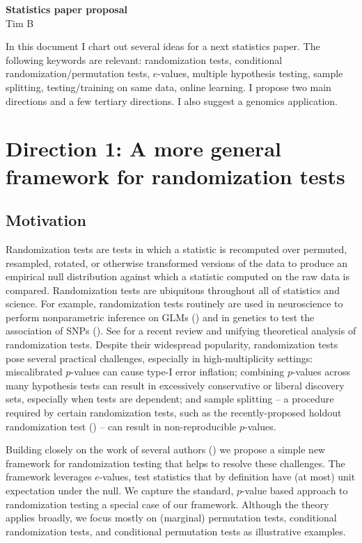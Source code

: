 \documentclass[12pt]{article}
\begin{document}
\begin{center}
\textbf{Statistics paper proposal} \\
Tim B
\end{center}

In this document I chart out several ideas for a next statistics paper. The following keywords are relevant: randomization tests, conditional randomization/permutation tests, $e$-values, multiple hypothesis testing, sample splitting, testing/training on same data, online learning. I propose two main directions and a few tertiary directions. I also suggest a genomics application.

\section*{Direction 1: A more general framework for randomization tests}

\subsection*{Motivation}

Randomization tests are tests in which a statistic is recomputed over permuted, resampled, rotated, or otherwise transformed versions of the data to produce an empirical null distribution against which a statistic computed on the raw data is compared. Randomization tests are ubiquitous throughout all of statistics and science. For example, randomization tests routinely are used in neuroscience to perform nonparametric inference on GLMs (\cite{Winkler2014}) and in genetics to test the association of SNPs (\cite{Johnson2010}). See \cite{Dobriban2021} for a recent review and unifying theoretical analysis of randomization tests. Despite their widespread popularity, randomization tests pose several practical challenges, especially in high-multiplicity settings: miscalibrated $p$-values can cause type-I error inflation; combining $p$-values across many hypothesis tests can result in excessively conservative or liberal discovery sets, especially when tests are dependent; and sample splitting -- a procedure required by certain randomization tests, such as the recently-proposed holdout randomization test (\cite{Tansey2021a}) -- can result in non-reproducible $p$-values.

Building closely on the work of several authors (\cite{Wang2020b,Vovk2020,Vovk2021b}) we propose a simple new framework for randomization testing that helps to resolve these challenges. The framework leverages $e$-values, test statistics that by definition have (at most) unit expectation under the null. We capture the standard, $p$-value based approach to randomization testing a special case of our framework. Although the theory applies broadly, we focus mostly on (marginal) permutation tests, conditional randomization tests, and conditional permutation tests as illustrative examples.
\end{document}
